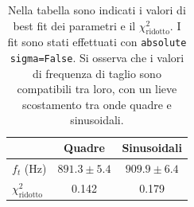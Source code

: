 \documentclass[10pt,a4paper]{article}
\begin{document}
\begin{table}[h!]
    \centering
    \begin{tabular}{lcc}
        \hline\hline
        & Quadre & Sinusoidali \\
        \hline
        $f_t$ (Hz) & $891.3 \pm 5.4$ & $909.9 \pm 6.4$ \\
        $\chi^2_{\text{ridotto}}$ & 0.142 & 0.179 \\
        \hline\hline
    \end{tabular}
    \caption{Nella tabella sono indicati i valori di best fit dei parametri e il $\chi^2_{\text{ridotto}}$. I fit sono stati effettuati con \texttt{absolute sigma=False}. Si osserva che i valori di frequenza di taglio sono compatibili tra loro, con un lieve scostamento tra onde quadre e sinusoidali.}
    \label{tab:FitResults}
\end{table}






  
\end{document}
